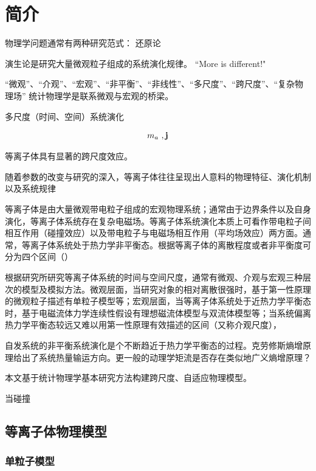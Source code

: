 
\chapter{简介}

物理学问题通常有两种研究范式：
  还原论
  
  演生论是研究大量微观粒子组成的系统演化规律。
    “More is different!"
  
  “微观”、“介观”、“宏观”、“非平衡”、“非线性”、“多尺度”、“跨尺度”、“复杂物理场”
   统计物理学是联系微观与宏观的桥梁。

   多尺度（时间、空间）系统演化

\begin{eqnarray}
	m_a~,\mathbf{j}
\end{eqnarray}

  
  
  等离子体具有显著的跨尺度效应。
  
  随着参数的改变与研究的深入，等离子体往往呈现出人意料的物理特征、演化机制以及系统规律

  等离子体是由大量微观带电粒子组成的宏观物理系统；通常由于边界条件以及自身演化，等离子体系统存在复杂电磁场。等离子体系统演化本质上可看作带电粒子间相互作用（碰撞效应）以及带电粒子与电磁场相互作用（平均场效应）两方面。通常，等离子体系统处于热力学非平衡态。根据等离子体的离散程度或者非平衡度可分为四个区间（）
  
  根据研究所研究等离子体系统的时间与空间尺度，通常有微观、介观与宏观三种层次的模型及模拟方法。微观层面，当研究对象的相对离散很强时，基于第一性原理的微观粒子描述有单粒子模型等；宏观层面，当等离子体系统处于近热力学平衡态时，基于电磁流体力学连续性假设有理想磁流体模型与双流体模型等；当系统偏离热力学平衡态较远又难以用第一性原理有效描述的区间（又称介观尺度），

  自发系统的非平衡系统演化是个不断趋近于热力学平衡态的过程。克劳修斯熵增原理给出了系统热量输运方向。更一般的动理学矩流是否存在类似地广义熵增原理？
  
  本文基于统计物理学基本研究方法构建跨尺度、自适应物理模型。
  
  当碰撞
  
\section{等离子体物理模型}
\label{等离子体物理模型}

  
  
\subsection{单粒子模型}
\label{单粒子模型}


